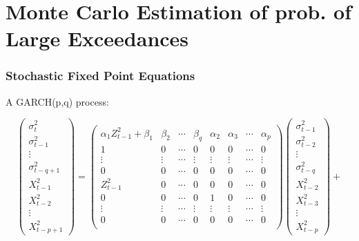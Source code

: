 \documentclass{beamer}
\begin{document}
\section{Monte Carlo Estimation of prob. of Large Exceedances}

\begin{frame}
  \frametitle{Stochastic Fixed Point Equations}
  A GARCH(p,q) process:
  \begin{tiny}
    \begin{equation*}
      \begin{pmatrix}
        \sigma_{t}^2 \\
        \sigma_{t-1}^2 \\
        \vdots \\
        \sigma_{t-q+1}^2 \\
        X_{t-1}^2 \\
        X_{t-2}^2 \\
        \vdots \\
        X_{t-p+1}^2
      \end{pmatrix} =
      \begin{pmatrix}
        \alpha_1 Z_{t-1}^2 + \beta_1 & \beta_2 & \cdots & \beta_q & \alpha_2 & \alpha_3 & \cdots & \alpha_p \\
        1 & 0 & \cdots & 0 & 0 & 0 & \cdots & 0 \\
        \vdots & \vdots & \cdots & \vdots & \vdots & \vdots & \cdots & \vdots \\
        0 & 0 & \cdots & 0 & 0 & 0 & \cdots & 0 \\
        Z_{t-1}^2 & 0 & \cdots & 0 & 0 & 0 & \cdots & 0 \\
        0 & 0 & \cdots & 0 & 1 & 0 & \cdots & 0 \\
        \vdots & \vdots & \cdots & \vdots & \vdots & \vdots & \cdots & \vdots \\
        0 & 0 & \cdots & 0 & 0 & 0 & \cdots & 0 \\    
      \end{pmatrix}
      \begin{pmatrix}
        \sigma_{t-1}^2 \\
        \sigma_{t-2}^2 \\
        \vdots \\
        \sigma_{t-q}^2 \\
        X_{t-2}^2 \\
        X_{t-3}^2 \\
        \vdots \\
        X_{t-p}^2
      \end{pmatrix} +

\end{equation*}
\end{tiny}
\end{frame}
\end{document}
